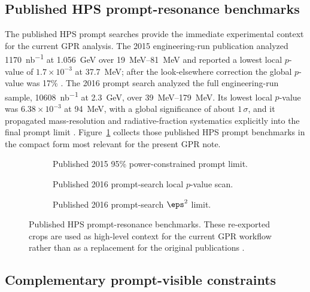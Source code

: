 \subsection{Published HPS prompt-resonance benchmarks}

The published HPS prompt searches provide the immediate experimental context for the
current GPR analysis. The 2015 engineering-run publication analyzed
\SI{1170}{nb^{-1}} at \SI{1.056}{GeV} over \SIrange{19}{81}{MeV} and reported a lowest
local $p$-value of $1.7\times10^{-3}$ at \SI{37.7}{MeV}; after the look-elsewhere
correction the global $p$-value was 17\%
\cite{HPS2015DarkPhoton}. The 2016 prompt search analyzed the full engineering-run
sample, \SI{10608}{nb^{-1}} at \SI{2.3}{GeV}, over \SIrange{39}{179}{MeV}. Its lowest
local $p$-value was $6.38\times10^{-3}$ at \SI{94}{MeV}, with a global significance of
about $1\,\sigma$, and it propagated mass-resolution and radiative-fraction
systematics explicitly into the final prompt limit \cite{HPS2016PromptLong}.
Figure~\ref{fig:published-hps-context} collects those published HPS prompt benchmarks
in the compact form most relevant for the present GPR note.

\begin{figure}[H]
\centering
\begin{subfigure}[t]{0.32\linewidth}
  \centering
  \caption{Published 2015 95\% power-constrained prompt limit.}
\end{subfigure}
\hfill
\begin{subfigure}[t]{0.32\linewidth}
  \centering
  \caption{Published 2016 prompt-search local $p$-value scan.}
\end{subfigure}
\hfill
\begin{subfigure}[t]{0.32\linewidth}
  \centering
  \caption{Published 2016 prompt-search $\eps^2$ limit.}
\end{subfigure}
\caption{Published HPS prompt-resonance benchmarks. These re-exported crops are used as
high-level context for the current GPR workflow rather than as a replacement for the
original publications \cite{HPS2015DarkPhoton,HPS2016PromptLong}.}
\label{fig:published-hps-context}
\end{figure}

\subsection{Complementary prompt-visible constraints}

